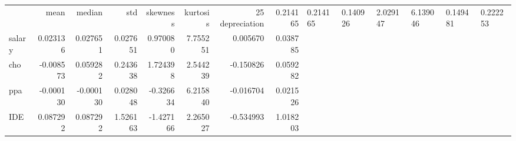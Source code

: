 \begin{tabular}{lrrrrrrr}
\toprule
 & mean & median & std & skewness & kurtosis & 25%
\midrule
depreciation & 0.214165 & 0.214165 & 0.140926 & 2.029147 & 6.139046 & 0.149481 & 0.222253 \\
salary & 0.023136 & 0.027651 & 0.027651 & 0.970080 & 7.755251 & 0.005670 & 0.038785 \\
cho & -0.008573 & 0.059282 & 0.243638 & 1.724398 & 2.544239 & -0.150826 & 0.059282 \\
ppa & -0.000130 & -0.000130 & 0.028048 & -0.326634 & 6.215840 & -0.016704 & 0.021526 \\
IDE & 0.087292 & 0.087292 & 1.526163 & -1.427166 & 2.265027 & -0.534993 & 1.018203 \\
\bottomrule
\end{tabular}

